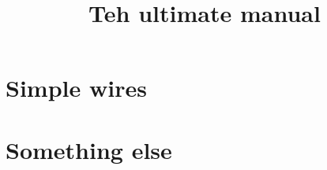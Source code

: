 \documentclass[10pt,a4paper]{article}
\title{Teh ultimate manual}
\begin{document}
	\maketitle
	
	\section{Simple wires}
	\section{Something else}
\end{document}
